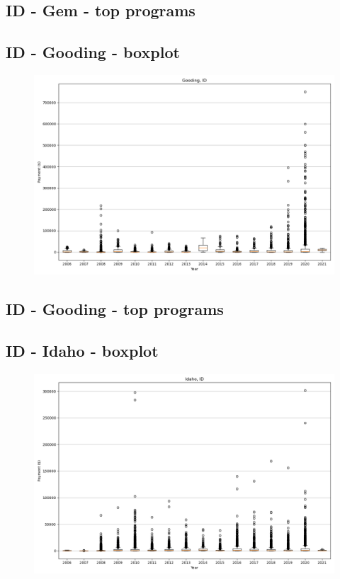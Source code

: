\subsection*{ID - Gem - top programs}

\newpage
\subsection*{ID - Gooding - boxplot}
\begin{figure}[h]
\centering
\includegraphics[width=7in]{../output/boxplots/counties/Gooding-ID_boxplot.png}
\end{figure}


\subsection*{ID - Gooding - top programs}

\newpage
\subsection*{ID - Idaho - boxplot}
\begin{figure}[h]
\centering
\includegraphics[width=7in]{../output/boxplots/counties/Idaho-ID_boxplot.png}
\end{figure}


